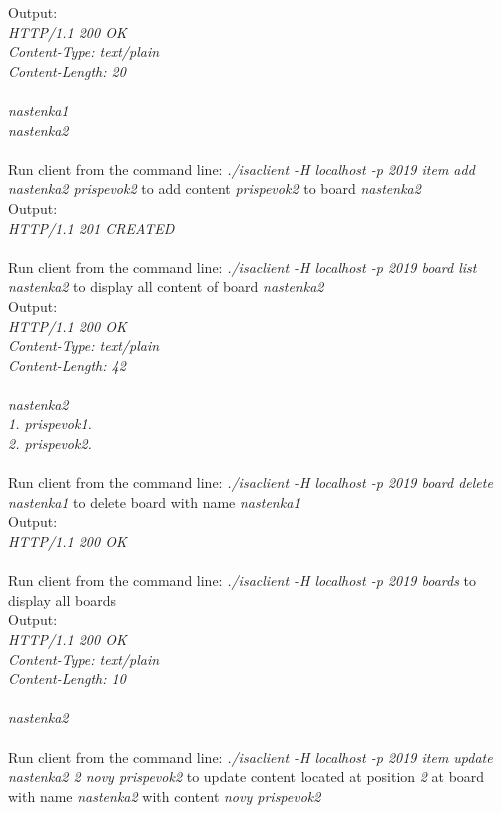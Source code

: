 \documentclass[11pt, a4paper]{article}
\begin{document}
	Output: \\
	\textit{HTTP/1.1 200 OK \\ Content-Type: text/plain \\ Content-Length: 20 \\ \\ nastenka1 \\ nastenka2 \\}
	\\Run client from the command line: \textit{./isaclient -H localhost -p 2019 item add nastenka2 prispevok2} to add content \textit{prispevok2} to board 		\textit{nastenka2} \\
	Output: \\
	\textit{HTTP/1.1 201 CREATED \\}
	\\Run client from the command line: \textit{./isaclient -H localhost -p 2019 board list nastenka2} to display all content of board \textit{nastenka2} \\
	Output: \\
	\textit{HTTP/1.1 200 OK \\ Content-Type: text/plain \\ Content-Length: 42 \\ \\ nastenka2 \\ 1. prispevok1. \\ 2. prispevok2. \\}
	\\Run client from the command line: \textit{./isaclient -H localhost -p 2019 board delete nastenka1} to delete board with name \textit{nastenka1} \\
	Output: \\
	\textit{HTTP/1.1 200 OK \\}
	\\Run client from the command line: \textit{./isaclient -H localhost -p 2019 boards} to display all boards \\
	Output: \\
	\textit{HTTP/1.1 200 OK \\ Content-Type: text/plain \\ Content-Length: 10 \\ \\ nastenka2 \\}
	\\Run client from the command line: \textit{./isaclient -H localhost -p 2019 item update nastenka2 2 novy prispevok2} to update content located at position \textit{2} at board with name \textit{nastenka2} with content \textit{novy prispevok2}\\
\end{document}
